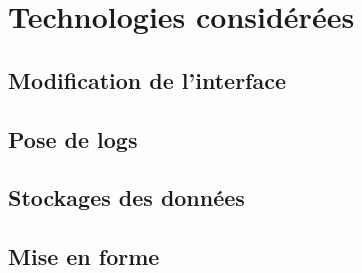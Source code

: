 \chapter{Technologies considérées}

    \section{Modification de l'interface}

    \section{Pose de logs}

  \section{Stockages des données}   

  \section{Mise en forme}